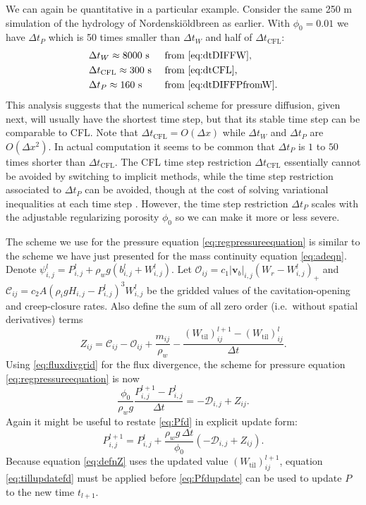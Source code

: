 \documentclass[gmd]{copernicus}   %
\newcommand{\text}{\textrm}
\newcommand\bv{\mathbf{v}}
\newcommand{\Wtil}{W_{\text{til}}}
\newcommand{\Wlij}{W^l_{i,j}}
\newcommand{\Plij}{P^l_{i,j}}
\newcommand{\Nbreen}{Nordenski\"oldbreen\xspace}
\begin{document}
We can again be quantitative in a particular example.  Consider the same 250 m simulation of the hydrology of \Nbreen as earlier.  With $\phi_0 = 0.01$ we have $\Delta t_P$ which is 50 times smaller than $\Delta t_W$ and half of $\Delta t_{\text{CFL}}$:
\begin{align*}
  &\Delta t_W            \approx 8000 \text{ s} &&\text{ from \eqref{eq:dtDIFFW}}, \\
  &\Delta t_{\text{CFL}} \approx 300  \text{ s} &&\text{ from \eqref{eq:dtCFL}}, \\
  &\Delta t_P            \approx 160  \text{ s} &&\text{ from \eqref{eq:dtDIFFPfromW}.}
\end{align*}
This analysis suggests that the numerical scheme for pressure diffusion, given next, will usually have the shortest time step, but that its stable time step can be comparable to CFL.  Note that $\Delta t_{\text{CFL}}=O(\Delta x)$ while $\Delta t_W$ and $\Delta t_P$ are $O(\Delta x^2)$.  In actual computation it seems to be common that $\Delta t_P$ is $1$ to $50$ times shorter than $\Delta t_{\text{CFL}}$.  The CFL time step restriction $\Delta t_{\text{CFL}}$ essentially cannot be avoided by switching to implicit methods, while the time step restriction associated to $\Delta t_P$ can be avoided, though at the cost of solving variational inequalities at each time step \citep{Schoofetal2012,Hewitt2013}.  However, the time step restriction $\Delta t_P$ scales with the adjustable regularizing porosity $\phi_0$ so we can make it more or less severe.

The scheme we use for the pressure equation \eqref{eq:regpressureequation} is similar to the scheme we have just presented for the mass continuity equation \eqref{eq:adeqn}.  Denote $\psi_{i,j}^l = P_{i,j}^l + \rho_w g (b_{i,j}^l + W_{i,j}^l)$.  Let $\mathcal{O}_{ij} = c_1 |\bv_b|_{i,j} \left(W_r - \Wlij\right)_+$ and $\mathcal{C}_{ij} = c_2 A \left(\rho_i g H_{i,j} - \Plij\right)^3 \Wlij$ be the gridded values of the cavitation-opening and creep-closure rates.  Also define the sum of all zero order (i.e.~without spatial derivatives) terms
\begin{equation}
Z_{ij} = \mathcal{C}_{ij} - \mathcal{O}_{ij} + \frac{m_{ij}}{\rho_w} - \frac{(\Wtil)_{ij}^{l+1} - (\Wtil)_{ij}^l}{\Delta t}.  \label{eq:defnZ}
\end{equation}
Using \eqref{eq:fluxdivgrid} for the flux divergence, the scheme for pressure equation \eqref{eq:regpressureequation} is now
\begin{equation}
\frac{\phi_0}{\rho_w g} \frac{P_{i,j}^{l+1} - \Plij}{\Delta t} = - \mathcal{D}_{i,j} + Z_{ij}.  \label{eq:Pfd}
\end{equation}
Again it might be useful to restate \eqref{eq:Pfd} in explicit update form:
\begin{equation}
P_{i,j}^{l+1} = \Plij + \frac{\rho_w g\,\Delta t}{\phi_0} \left(- \mathcal{D}_{i,j} + Z_{ij}\right). \label{eq:Pfdupdate}
\end{equation}
Because equation \eqref{eq:defnZ} uses the updated value $(\Wtil)_{ij}^{l+1}$, equation \eqref{eq:tillupdatefd} must be applied before \eqref{eq:Pfdupdate} can be used to update $P$ to the new time $t_{l+1}$.
\end{document}
